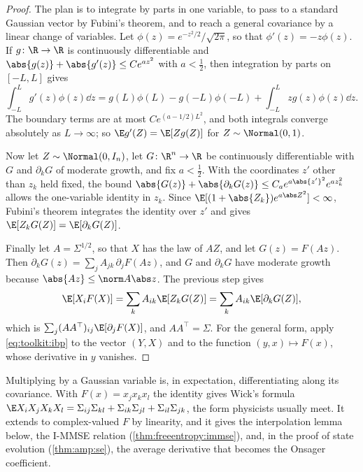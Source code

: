 \begin{refsection}
\begin{proof}
The plan is to integrate by parts in one variable, to pass to a standard Gaussian vector by Fubini's theorem, and to reach a general covariance by a linear change of variables. Let $\phi(z)=e^{-z^2/2}/\sqrt{2\pi}$, so that $\phi'(z)=-z\phi(z)$. If $g\colon\R\to\R$ is continuously differentiable and $\abs{g(z)}+\abs{g'(z)}\le Ce^{az^2}$ with $a<\frac12$, then integration by parts on $[-L,L]$ gives
\[
\int_{-L}^Lg'(z)\phi(z)\dd z=g(L)\phi(L)-g(-L)\phi(-L)+\int_{-L}^Lzg(z)\phi(z)\dd z.
\]
The boundary terms are at most $Ce^{(a-1/2)L^2}$, and both integrals converge absolutely as $L\to\infty$; so $\E g'(Z)=\E[Zg(Z)]$ for $Z\sim\Normal(0,1)$.

Now let $Z\sim\Normal(0,I_n)$, let $G\colon\R^n\to\R$ be continuously differentiable with $G$ and $\partial_kG$ of moderate growth, and fix $a<\frac12$. With the coordinates $z'$ other than $z_k$ held fixed, the bound $\abs{G(z)}+\abs{\partial_kG(z)}\le C_ae^{a\abs{z'}^2}e^{az_k^2}$ allows the one-variable identity in $z_k$. Since $\E[(1+\abs{Z_k})e^{a\abs Z^2}]<\infty$, Fubini's theorem integrates the identity over $z'$ and gives $\E[Z_kG(Z)]=\E[\partial_kG(Z)]$.

Finally let $A=\Sigma^{1/2}$, so that $X$ has the law of $AZ$, and let $G(z)=F(Az)$. Then $\partial_kG(z)=\sum_jA_{jk}\,\partial_jF(Az)$, and $G$ and $\partial_kG$ have moderate growth because $\abs{Az}\le\norm A\abs z$. The previous step gives
\[
\E[X_iF(X)]=\sum_kA_{ik}\E[Z_kG(Z)]=\sum_kA_{ik}\E[\partial_kG(Z)],
\]
which is $\sum_j(AA^\top)_{ij}\E[\partial_jF(X)]$, and $AA^\top=\Sigma$. For the general form, apply \eqref{eq:toolkit:ibp} to the vector $(Y,X)$ and to the function $(y,x)\mapsto F(x)$, whose derivative in $y$ vanishes.
\end{proof}

Multiplying by a Gaussian variable is, in expectation, differentiating along its covariance. With $F(x)=x_jx_kx_l$ the identity gives Wick's formula $\E X_iX_jX_kX_l=\Sigma_{ij}\Sigma_{kl}+\Sigma_{ik}\Sigma_{jl}+\Sigma_{il}\Sigma_{jk}$, the form physicists usually meet. It extends to complex-valued $F$ by linearity, and it gives the interpolation lemma below, the I-MMSE relation (\cref{thm:freeentropy:immse}), and, in the proof of state evolution (\cref{thm:amp:se}), the average derivative that becomes the Onsager coefficient.


\end{refsection}
